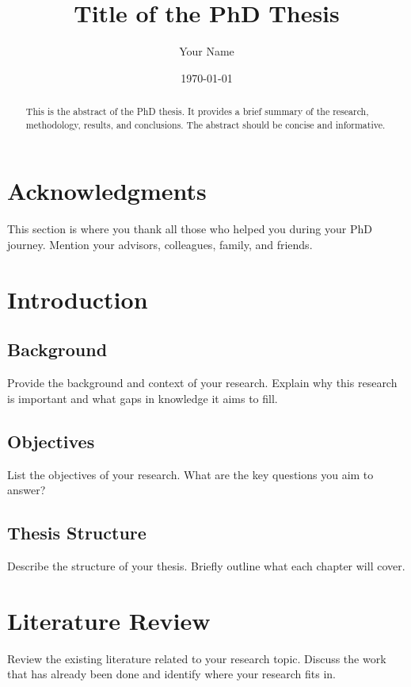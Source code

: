 \documentclass{article}
\title{Title of the PhD Thesis}
\author{Your Name}
\date{\today}
\begin{document}
\maketitle

\begin{abstract}
This is the abstract of the PhD thesis. It provides a brief summary of the research, methodology, results, and conclusions. The abstract should be concise and informative.
\end{abstract}

\tableofcontents

\newpage

\section*{Acknowledgments}
This section is where you thank all those who helped you during your PhD journey. Mention your advisors, colleagues, family, and friends.

\newpage

\section{Introduction}
\subsection{Background}
Provide the background and context of your research. Explain why this research is important and what gaps in knowledge it aims to fill.

\subsection{Objectives}
List the objectives of your research. What are the key questions you aim to answer?

\subsection{Thesis Structure}
Describe the structure of your thesis. Briefly outline what each chapter will cover.

\newpage

\section{Literature Review}
Review the existing literature related to your research topic. Discuss the work that has already been done and identify where your research fits in.
\end{document}
